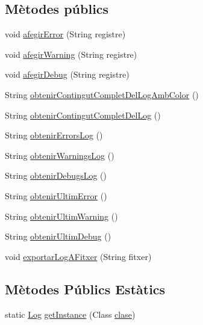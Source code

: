 \subsection*{Mètodes públics}
\begin{DoxyCompactItemize}
\item 
void \hyperlink{classlogica_1_1log_1_1_log_abdcf225ffc06e746b5d224c060b01f98}{afegir\+Error} (String registre)
\item 
void \hyperlink{classlogica_1_1log_1_1_log_af5a685966d6e6ef00d93c879b4f3154a}{afegir\+Warning} (String registre)
\item 
void \hyperlink{classlogica_1_1log_1_1_log_a22b7784b896630f85cd9791d02d13d70}{afegir\+Debug} (String registre)
\item 
String \hyperlink{classlogica_1_1log_1_1_log_a4f1a4853972d056a0da55189e4ebf4da}{obtenir\+Contingut\+Complet\+Del\+Log\+Amb\+Color} ()
\item 
String \hyperlink{classlogica_1_1log_1_1_log_a1902dfacc9adf60b63a801c7d32c4dcf}{obtenir\+Contingut\+Complet\+Del\+Log} ()
\item 
String \hyperlink{classlogica_1_1log_1_1_log_adbe0cf7e75ae815279d2e88cf110e29b}{obtenir\+Errors\+Log} ()
\item 
String \hyperlink{classlogica_1_1log_1_1_log_ad7447bfb49c4ec37d1a740a3d5750c63}{obtenir\+Warnings\+Log} ()
\item 
String \hyperlink{classlogica_1_1log_1_1_log_a8a577eb2906568f3501667482d80dfc0}{obtenir\+Debugs\+Log} ()
\item 
String \hyperlink{classlogica_1_1log_1_1_log_a7d2d9d5951e933a735d4700d2d52c8ac}{obtenir\+Ultim\+Error} ()
\item 
String \hyperlink{classlogica_1_1log_1_1_log_a06dd49f9ab88537f9f0c7a66749c2f7c}{obtenir\+Ultim\+Warning} ()
\item 
String \hyperlink{classlogica_1_1log_1_1_log_a19589f17f8be0527f89145d59ee64081}{obtenir\+Ultim\+Debug} ()
\item 
void \hyperlink{classlogica_1_1log_1_1_log_a9f9c696aee364b77288dffc4d6d57e8b}{exportar\+Log\+A\+Fitxer} (String fitxer)
\end{DoxyCompactItemize}
\subsection*{Mètodes Públics Estàtics}
\begin{DoxyCompactItemize}
\item 
static \hyperlink{classlogica_1_1log_1_1_log}{Log} \hyperlink{classlogica_1_1log_1_1_log_ab38bea9cfc1ad368b40a2773f93d14b8}{get\+Instance} (Class \hyperlink{classlogica_1_1log_1_1_log_af7d3b68ff7c0d75c4bfda5364b37b2ad}{clase})
\end{DoxyCompactItemize}
